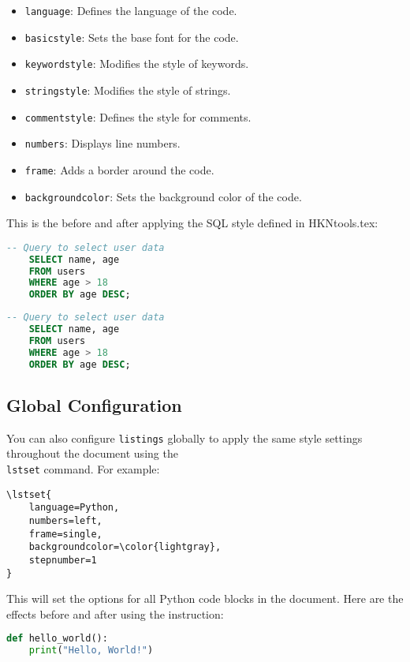 \begin{itemize}
	\item \texttt{language}: Defines the language of the code.
	\item \texttt{basicstyle}: Sets the base font for the code.
	\item \texttt{keywordstyle}: Modifies the style of keywords.
	\item \texttt{stringstyle}: Modifies the style of strings.
	\item \texttt{commentstyle}: Defines the style for comments.
	\item \texttt{numbers}: Displays line numbers.
	\item \texttt{frame}: Adds a border around the code.
	\item \texttt{backgroundcolor}: Sets the background color of the code.
\end{itemize}

This is the before and after applying the SQL style defined in HKNtools.tex:

\begin{lstlisting}[language=SQL]
	-- Query to select user data
	SELECT name, age
	FROM users
	WHERE age > 18
	ORDER BY age DESC;
\end{lstlisting}

\begin{lstlisting}[language=SQL, style=hkn]
	-- Query to select user data
	SELECT name, age
	FROM users
	WHERE age > 18
	ORDER BY age DESC;
\end{lstlisting}

\subsection{Global Configuration}

You can also configure \texttt{listings} globally to apply the same style settings throughout the document using the \texttt{\\lstset} command. For example:

\begin{lstlisting}
\lstset{
	language=Python,
	numbers=left,
	frame=single,
	backgroundcolor=\color{lightgray},
	stepnumber=1
}
\end{lstlisting}

This will set the options for all Python code blocks in the document.
Here are the effects before and after using the instruction:

\begin{lstlisting}[language=Python]
	def hello_world():
	print("Hello, World!")
\end{lstlisting}

